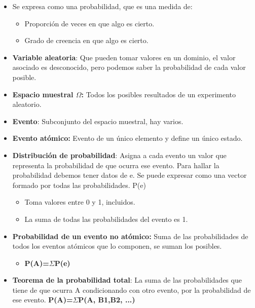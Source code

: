 \documentclass[12pt, twoside, openright]{report} %
\begin{document}
  \begin{itemize}
  \item Se expresa como una probabilidad, que es una medida de:
    

    \begin{itemize}
    \item Proporción de veces en que algo es cierto.
      
    \item Grado de creencia en que algo es cierto.
      
    \end{itemize}
  \item \textbf{Variable aleatoria}: Que pueden tomar valores en un dominio,
    el valor asociado es desconocido, pero podemos saber la probabilidad
    de cada valor posible.
    
  \item \textbf{Espacio muestral $\Omega$:} Todos los posibles resultados de un
    experimento aleatorio.
    
  \item \textbf{Evento}: Subconjunto del espacio muestral, hay varios.
    
  \item \textbf{Evento atómico:} Evento de un único elemento y define un
    único estado.
    
  \item \textbf{Distribución de probabilidad}: Asigna a cada evento un valor
    que representa la probabilidad de que ocurra ese evento. Para hallar
    la probabilidad debemos tener datos de e. Se puede expresar como una
    vector formado por todas las probabilidades. P(e)
    

    \begin{itemize}
    \item Toma valores entre 0 y 1, incluidos.
      
    \item La suma de todas las probabilidades del evento es 1.
      
    \end{itemize}
  \item \textbf{Probabilidad de un evento no atómico:} Suma de las
    probabilidades de todos los eventos atómicos que lo componen, se
    suman los posibles.
    

    \begin{itemize}
    \item \textbf{P(A)=$\Sigma$P(e)}
      
    \end{itemize}
  \item \textbf{Teorema de la probabilidad total}: La suma de las
    probabilidades que tiene de que ocurra A condicionando con otro
    evento, por la probabilidad de ese evento. \textbf{P(A)=$\Sigma$P(A, B1,B2,
    ...)}
    

\end{itemize}
\end{document}
